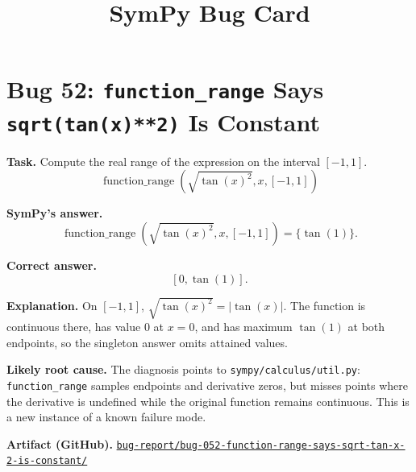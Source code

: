 \documentclass[11pt]{article}
\title{SymPy Bug Card}
\date{}
\newcommand{\artifactrepo}{https://github.com/TODO-org/TODO-repo}
\newcommand{\bugbundle}[1]{\href{\artifactrepo/tree/main/bug-report/#1}{\nolinkurl{bug-report/#1/}}}
\begin{document}
\author{}
\maketitle

\section*{Bug 52: \texttt{function\_range} Says \texttt{sqrt(tan(x)**2)} Is Constant}

\begin{counterexamplebox}
\textbf{Task.} Compute the real range of the expression on the interval
\([-1,1]\).
\[
  \operatorname{function\_range}\!\left(\sqrt{\tan(x)^2}, x, [-1,1]\right)
\]

\medskip
\textbf{SymPy's answer.}
\[
  \operatorname{function\_range}\!\left(\sqrt{\tan(x)^2}, x, [-1,1]\right)
  = \{\tan(1)\}.
\]

\medskip
\textbf{Correct answer.}
\[
  [0,\tan(1)].
\]

\medskip
\textbf{Explanation.} On \([-1,1]\), \(\sqrt{\tan(x)^2}=|\tan(x)|\). The
function is continuous there, has value \(0\) at \(x=0\), and has maximum
\(\tan(1)\) at both endpoints, so the singleton answer omits attained values.

\medskip
\textbf{Likely root cause.} The diagnosis points to
\nolinkurl{sympy/calculus/util.py}: \texttt{function\_range} samples endpoints
and derivative zeros, but misses points where the derivative is undefined while
the original function remains continuous. This is a new instance of a known
failure mode.

\medskip
\textbf{Artifact (GitHub).} \bugbundle{bug-052-function-range-says-sqrt-tan-x-2-is-constant}
\end{counterexamplebox}
\end{document}
